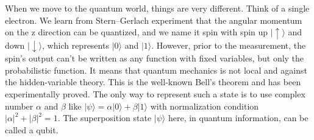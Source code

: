 When we move to the quantum world, things are very different. Think of a single electron. We learn from Stern–Gerlach experiment that the angular momentum on the z direction can be quantized, and we name it spin with spin up $|\uparrow\rangle$ and down $|\downarrow\rangle$, which represents $|0\rangle$ and $|1\rangle$. However, prior to the measurement, the spin's output can't be written as any function with fixed variables, but only the probabilistic function. It means that quantum mechanics is not local and against the hidden-variable theory. This is the well-known Bell's theorem\cite{RN52} and has been experimentally proved\cite{RN53}. The only way to represent such a state is to use complex number $\alpha$ and $\beta$ like $|\psi\rangle = \alpha|0\rangle + \beta|1\rangle$ with normalization condition $|\alpha|^2 + |\beta|^2 = 1$. The superposition state $|\psi\rangle$ here, in quantum information, can be called a qubit.

